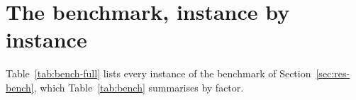 \section{The benchmark, instance by instance}
\label{appendix:bench}

Table~\ref{tab:bench-full} lists every instance of the benchmark of
Section~\ref{sec:res-bench}, which Table~\ref{tab:bench} summarises by
factor.



\FloatBarrier
